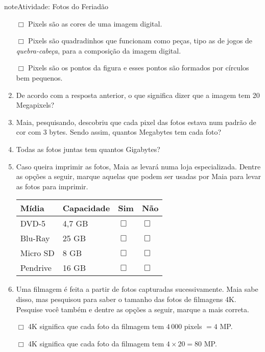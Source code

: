 \begin{sphinxadmonition}{note}{Atividade: Fotos do Feriadão}
\begin{enumerate}
\(\Box\) Pixels são as cores de uma imagem digital.

\(\Box\) Pixels são quadradinhos que funcionam como peças, tipo as de jogos de \textit{quebra-cabeça}, para a composição da imagem digital.

\(\Box\) Pixels são os pontos da figura e esses pontos são formados por círculos bem pequenos.

\item {} 
De acordo com a resposta anterior, o que significa dizer que a imagem tem 20 Megapixels?

\item {} 
Maia, pesquisando, descobriu que cada pixel das fotos estava num padrão de cor com 3 bytes. Sendo assim, quantos Megabytes tem cada foto?

\item {} 
Todas as fotos juntas tem quantos Gigabytes?

\item {} 
Caso queira imprimir as fotos, Maia  as levará numa loja especializada. Dentre as opções a seguir, marque aquelas que podem ser usadas por Maia para levar as fotos para imprimir.


\begin{savenotes}\sphinxattablestart
\centering
\begin{tabulary}{\linewidth}[t]{|T|T|T|T|}
\hline

Mídia
&
Capacidade
&
Sim
&
Não
\\
\hline
DVD-5
&
4,7 GB
&
\(\Box\)
&
\(\Box\)
\\
\hline
Blu-Ray
&
25 GB
&
\(\Box\)
&
\(\Box\)
\\
\hline
Micro SD
&
8 GB
&
\(\Box\)
&
\(\Box\)
\\
\hline
Pendrive
&
16 GB
&
\(\Box\)
&
\(\Box\)
\\
\hline
\end{tabulary}
\par
\sphinxattableend\end{savenotes}

\item {} 
Uma filmagem é feita a partir de fotos capturadas sucessivamente. Maia sabe disso, mas pesquisou para saber o tamanho das fotos de filmagens 4K. Pesquise você também e dentre as opções a seguir, marque a mais correta.

\(\Box\) 4K significa que cada foto da filmagem tem \(4\,000\) pixels \(= 4\) MP.

\(\Box\) 4K significa que cada foto da filmagem tem \(4 \times 20 = 80\) MP.


\end{enumerate}
\end{sphinxadmonition}

